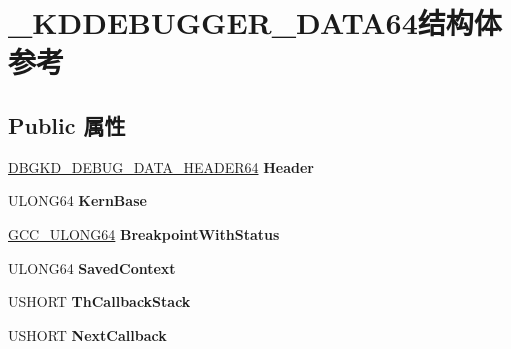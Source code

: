 \hypertarget{struct___k_d_d_e_b_u_g_g_e_r___d_a_t_a64}{}\section{\+\_\+\+K\+D\+D\+E\+B\+U\+G\+G\+E\+R\+\_\+\+D\+A\+T\+A64结构体 参考}
\label{struct___k_d_d_e_b_u_g_g_e_r___d_a_t_a64}
\subsection*{Public 属性}
\begin{DoxyCompactItemize}
\item 
\mbox{\label{struct___k_d_d_e_b_u_g_g_e_r___d_a_t_a64_acfd61743c38f073fb3a09aaf35966041}} 
\hyperlink{struct___d_b_g_k_d___d_e_b_u_g___d_a_t_a___h_e_a_d_e_r64}{D\+B\+G\+K\+D\+\_\+\+D\+E\+B\+U\+G\+\_\+\+D\+A\+T\+A\+\_\+\+H\+E\+A\+D\+E\+R64} {\bfseries Header}
\item 
\mbox{\label{struct___k_d_d_e_b_u_g_g_e_r___d_a_t_a64_ade295650324dadf7b1c9220b6ca19dbe}} 
U\+L\+O\+N\+G64 {\bfseries Kern\+Base}
\item 
\mbox{\label{struct___k_d_d_e_b_u_g_g_e_r___d_a_t_a64_a82ad98f5d7630465c29b2049d7a63cd4}} 
\hyperlink{union___g_c_c___u_l_o_n_g64}{G\+C\+C\+\_\+\+U\+L\+O\+N\+G64} {\bfseries Breakpoint\+With\+Status}
\item 
\mbox{\label{struct___k_d_d_e_b_u_g_g_e_r___d_a_t_a64_a838a1855ba7b497b111f39b67328546e}} 
U\+L\+O\+N\+G64 {\bfseries Saved\+Context}
\item 
\mbox{\label{struct___k_d_d_e_b_u_g_g_e_r___d_a_t_a64_a22e1fb4c408cfcacfc401491d6574138}} 
U\+S\+H\+O\+RT {\bfseries Th\+Callback\+Stack}
\item 
\mbox{\label{struct___k_d_d_e_b_u_g_g_e_r___d_a_t_a64_a7309a21c5e477b69f85511ba843ec634}} 
U\+S\+H\+O\+RT {\bfseries Next\+Callback}
\item 
\mbox{\label{struct___k_d_d_e_b_u_g_g_e_r___d_a_t_a64_a6793234f8c981e4cd9847e16efb43b60}} 

\end{DoxyCompactItemize}
